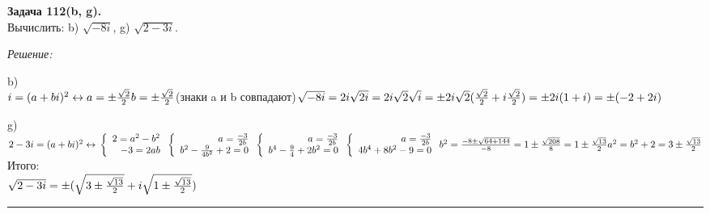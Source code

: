 \documentclass[a4paper, 12pt]{article}
\newenvironment{problem}[2][Задача]
    { \begin{mdframed}[backgroundcolor=gray!10] \textbf{#1 #2.} \\}
    {  \end{mdframed}}
\newenvironment{solution}
    {\textit{Решение: }}
    {\noindent\rule{7in}{1.5pt}}
\begin{document}
\begin{problem}{112(b, g)}
Вычислить: b) $\sqrt{-8i}$, g) $\sqrt{2-3i}$.
\end{problem}
\begin{solution}

b) \\
$
i = (a + bi)^2 \leftrightarrow \\
a = \pm \frac{\sqrt2}{2} \\
b = \pm \frac{\sqrt2}{2} \\
$(знаки a и b совпадают)$ \\
\\
\sqrt{-8i} = 2i\sqrt{2i} = 2i\sqrt2\sqrt{i} =
\pm 2i\sqrt2 (\frac{\sqrt2}{2} + i\frac{\sqrt2}{2}) =
\pm 2i (1 + i) = \pm (-2 + 2i)
$

g) \\
$
2 - 3i = (a + bi)^2 \leftrightarrow \\
\left\{
  \begin{array}{rr}
    2 = a^2 - b^2 \\
    -3 = 2ab
  \end{array}
\right.
\left\{
  \begin{array}{rr}
    a = \frac{-3}{2b} \\
    b^2 - \frac{9}{4b^2} + 2 = 0
  \end{array}
\right.
\left\{
  \begin{array}{rr}
    a = \frac{-3}{2b} \\
    b^4 - \frac{9}{4} + 2b^2 = 0
  \end{array}
\right.
\left\{
  \begin{array}{rr}
    a = \frac{-3}{2b} \\
    4b^4 + 8b^2 - 9 = 0
  \end{array}
\right.
\\
b^2 = \frac{-8 \pm \sqrt{64 + 144}}{-8} =
1 \pm \frac{\sqrt{208}}{8} = 1 \pm \frac{\sqrt{13}}{2} \\
a^2 = b^2 + 2 = 3 \pm \frac{\sqrt{13}}{2} \\
$
Итого: \\
$
\sqrt{2 - 3i} =
\pm(\sqrt{3 \pm \frac{\sqrt{13}}{2}} + i\sqrt{1 \pm \frac{\sqrt{13}}{2}}) \\
$

\end{solution}
\end{document}
